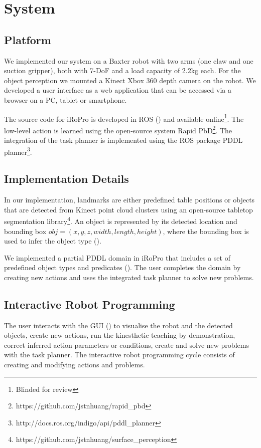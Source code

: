 \section{System}
\label{sec:system}
\subsection{Platform}
\label{sec:platform}
We implemented our system on a Baxter robot with two arms (one claw and one suction gripper), both with 7-DoF and a load capacity of 2.2kg each.
For the object perception we mounted a Kinect Xbox 360 depth camera on the robot.
We developed a user interface as a web application that can be accessed via a browser on a PC, tablet or smartphone.

The source code for iRoPro is developed in ROS (\cite{quigley2009ros}) and available online\footnote{Blinded for review}. %
The low-level action is learned using the open-source system Rapid PbD\footnote{https://github.com/jstnhuang/rapid\_pbd}.
The integration of the task planner is implemented using the ROS package PDDL planner\footnote{http://docs.ros.org/indigo/api/pddl\_planner}.

\subsection{Implementation Details}
\label{sec:implementation}
In our implementation, landmarks are either predefined table positions or 
objects that are detected from Kinect point cloud clusters using an open-source tabletop segmentation library\footnote{https://github.com/jstnhuang/surface\_perception}.
An object is represented by its detected location and bounding box $obj = (x,y,z, width, length, height)$, where the bounding box is used to infer the object type ().

We implemented a partial PDDL domain in iRoPro that includes a set of predefined object types and predicates ().
The user completes the domain by creating new actions and uses the integrated task planner to solve new problems.


\subsection{Interactive Robot Programming}
\label{sec:interactive}
The user interacts with the GUI () to visualise the robot and the detected objects, create new actions, run the kinesthetic teaching by demonstration, correct inferred action parameters or conditions, create and solve new problems with the task planner.
The interactive robot programming cycle consists of creating and modifying actions and problems.
